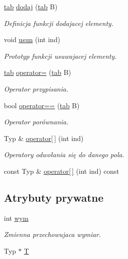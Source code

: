 \begin{DoxyCompactItemize}
\hyperlink{classtab}{tab} \hyperlink{classtab_a39edfcc37ce6fc7d6bd27f0555c2d50b}{dodaj} (\hyperlink{classtab}{tab} \-B)
\begin{DoxyCompactList}\small\item\em \-Definicja funkcji dodajacej elementy. \end{DoxyCompactList}\item 
void \hyperlink{classtab_a2bf843dc30ad51922a85f676f978dd47}{usun} (int ind)
\begin{DoxyCompactList}\small\item\em \-Prototyp funkcji usuwajacej elementy. \end{DoxyCompactList}\item 
\hyperlink{classtab}{tab} \hyperlink{classtab_af4207a08771650dd947de83cb57bcf27}{operator=} (\hyperlink{classtab}{tab} \-B)
\begin{DoxyCompactList}\small\item\em \-Operator przypisania. \end{DoxyCompactList}\item 
bool \hyperlink{classtab_a2729682ece1734772085a32ab2a992e5}{operator==} (\hyperlink{classtab}{tab} \-B)
\begin{DoxyCompactList}\small\item\em \-Operator porównania. \end{DoxyCompactList}\item 
\-Typ \& \hyperlink{classtab_a85ddf1710645b9e1ffd36726830a581b}{operator\mbox{[}$\,$\mbox{]}} (int ind)
\begin{DoxyCompactList}\small\item\em \-Operatory odwołania się do danego pola. \end{DoxyCompactList}\item 
const \-Typ \& \hyperlink{classtab_a7896ca836d17e0636804124889c742dc}{operator\mbox{[}$\,$\mbox{]}} (int ind) const 
\end{DoxyCompactItemize}
\subsection*{\-Atrybuty prywatne}
\begin{DoxyCompactItemize}
\item 
int \hyperlink{classtab_a3bb4a59327034c236f8fe9c0c35b90a7}{wym}
\begin{DoxyCompactList}\small\item\em \-Zmienna przechowujaca wymiar. \end{DoxyCompactList}\item 
\-Typ $\ast$ \hyperlink{classtab_a97745f07acefb042ad21811141f51afb}{\-T}
\end{DoxyCompactItemize}



